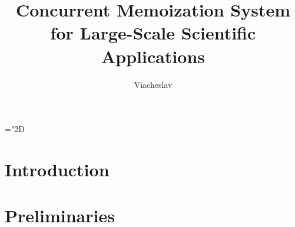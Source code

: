 \documentclass[thesis=B,english,hidelinks]{FITthesis}[2012/10/20]
\title{Concurrent Memoization System for Large-Scale Scientific Applications}
\author{Viacheslav} %
\begin{document}

\newcommand{\smplimage}[3][1]{
    \centerline{\texttt{[image: \#2.\#3]}}
}

\newcommand{\image}[4][1]{
\begin{figure}[H]
    \smplimage[#1]{#2}{#3}
	\caption{#4}
    \label{fig:#2}
\end{figure}
}

\newcommand{\func}[2]{\ensuremath{\textbf{\textit{#1}}(#2)}}
\newcommand{\nsnum}[2]{\ensuremath{\texttt{#1}_{#2}}}
\newcommand{\findop}{\func{find}{}\xspace}
\newcommand{\insertop}{\func{insert}{}\xspace}
\newcommand{\removeop}{\func{remove}{}\xspace}

\newcommand{\classname}[1]{\texttt{#1}\xspace}
\newcommand{\pathname}[1]{\path{#1}}

\mathchardef\mhyphen="2D


\newcommand\blockitem[1][]{%
  \closepage\item[#1]\minipage[t]{\linewidth}%
  \let\closepage\endminipage%
  }
\newenvironment{block-description}{%
  \description
  \let\olditem\item
  \let\closepage\relax
}{%
  \closepage
  \enddescription
}

\setlength{\parindent}{0em}
\setlength{\parskip}{1em}


    \chapter{Introduction}
    


    \chapter{Preliminaries}
    \label{ch:pre}
    
\end{document}

